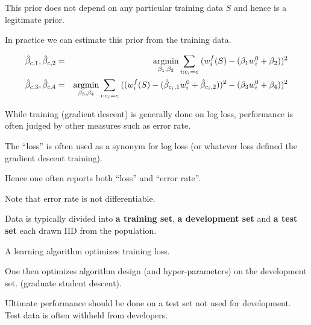 {{This prior does not depend on any particular training data $S$ and hence is a legitimate prior.

\vfill
In practice we can estimate this prior from the training data.

\begin{eqnarray*}
\hat{\beta}_{c,1},\hat{\beta}_{c,2} & = & \operatorname*{argmin}_{\beta_1,\beta_2} \sum_{i: c_i = c}\;(w_i^f(S) - (\beta_1 w_i^0 + \beta_2))^2 \\
\hat{\beta}_{c,3},\hat{\beta}_{c,4} &  = & \operatorname*{argmin}_{\beta_3,\beta_4} \sum_{i: c_i = c}\;((w_i^f(S) - (\hat{\beta}_{c_i,1} w_i^0 + \hat{\beta}_{c_i,2}))^2 - (\beta_3 w_i^0 + \beta_4))^2
\end{eqnarray*}
}

While training (gradient descent) is generally done on log loss, performance is often judged by other measures such as error rate.

\vfill
The ``loss'' is often used as a synonym for log loss (or whatever loss defined the gradient descent training).

\vfill
Hence one often reports both ``loss'' and ``error rate''.

\vfill
Note that error rate is not differentiable.


Data is typically divided into {\bf a training set}, {\bf a development set} and {\bf a test set} each drawn IID from the population.

\vfill
A learning algorithm optimizes training loss.

\vfill
One then optimizes algorithm design (and hyper-parameters) on the development set. (graduate student descent).

\vfill
Ultimate performance should be done on a test set not used for development.  Test data is often withheld from developers.


}


